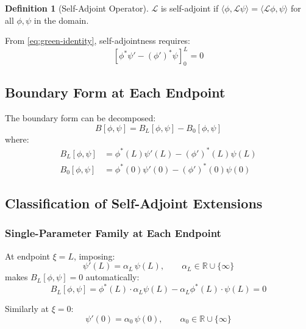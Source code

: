\documentclass[11pt,a4paper]{article}
\theoremstyle{definition}
\newtheorem{definition}{Definition}[section]
\theoremstyle{plain}
\theoremstyle{remark}
\begin{document}
\begin{definition}[Self-Adjoint Operator]
\label{def:self-adjoint}
$\mathcal{L}$ is self-adjoint if $\langle \phi, \mathcal{L}\psi \rangle = \langle \mathcal{L}\phi, \psi \rangle$
for all $\phi, \psi$ in the domain.
\end{definition}

From \cref{eq:green-identity}, self-adjointness requires:
\begin{equation}
\left[\phi^*\psi' - (\phi')^*\psi\right]_0^L = 0
\label{eq:SA-condition}
\end{equation}

\subsection{Boundary Form at Each Endpoint}

The boundary form can be decomposed:
\begin{equation}
B[\phi,\psi] = B_L[\phi,\psi] - B_0[\phi,\psi]
\label{eq:boundary-form-decomp}
\end{equation}
where:
\begin{align}
B_L[\phi,\psi] &= \phi^*(L)\psi'(L) - (\phi')^*(L)\psi(L) \label{eq:BL} \\
B_0[\phi,\psi] &= \phi^*(0)\psi'(0) - (\phi')^*(0)\psi(0) \label{eq:B0}
\end{align}

\subsection{Classification of Self-Adjoint Extensions}

\subsubsection{Single-Parameter Family at Each Endpoint}

At endpoint $\xi = L$, imposing:
\begin{equation}
\psi'(L) = \alpha_L \, \psi(L), \qquad \alpha_L \in \mathbb{R} \cup \{\infty\}
\label{eq:robin-L}
\end{equation}
makes $B_L[\phi,\psi] = 0$ automatically:
\begin{equation}
B_L[\phi,\psi] = \phi^*(L) \cdot \alpha_L\psi(L) - \alpha_L\phi^*(L) \cdot \psi(L) = 0
\label{eq:BL-vanish}
\end{equation}

Similarly at $\xi = 0$:
\begin{equation}
\psi'(0) = \alpha_0 \, \psi(0), \qquad \alpha_0 \in \mathbb{R} \cup \{\infty\}
\label{eq:robin-0}
\end{equation}
\end{document}
